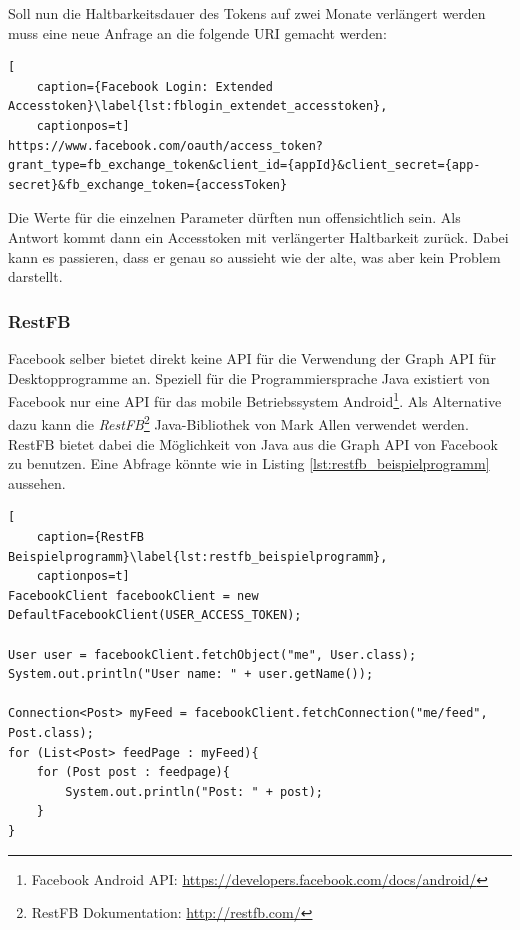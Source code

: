 Soll nun die Haltbarkeitsdauer des Tokens auf zwei Monate verlängert werden muss eine neue Anfrage an die folgende URI gemacht werden:

\begin{lstlisting}[
    caption={Facebook Login: Extended Accesstoken}\label{lst:fblogin_extendet_accesstoken},
    captionpos=t]
https://www.facebook.com/oauth/access_token?grant_type=fb_exchange_token&client_id={appId}&client_secret={app-secret}&fb_exchange_token={accessToken}
\end{lstlisting} 

Die Werte für die einzelnen Parameter dürften nun offensichtlich sein. Als Antwort kommt dann ein Accesstoken mit verlängerter Haltbarkeit zurück. Dabei kann es passieren, dass er genau so aussieht wie der alte, was aber kein Problem darstellt.



\subsubsection{RestFB} %
\label{ssub:restfb}

Facebook selber bietet direkt keine API für die Verwendung der Graph API für Desktopprogramme an. Speziell für die Programmiersprache Java existiert von Facebook nur eine API für das mobile Betriebssystem Android\footnote{Facebook Android API: \url{https://developers.facebook.com/docs/android/}}. Als Alternative dazu kann die \emph{RestFB}\footnote{RestFB Dokumentation: \url{ http://restfb.com/}} Java-Bibliothek von Mark Allen verwendet werden. RestFB bietet dabei die Möglichkeit von Java aus die Graph API von Facebook zu benutzen. Eine Abfrage könnte wie in Listing \ref{lst:restfb_beispielprogramm} aussehen.

\begin{lstlisting}[
    caption={RestFB Beispielprogramm}\label{lst:restfb_beispielprogramm},
    captionpos=t]
FacebookClient facebookClient = new DefaultFacebookClient(USER_ACCESS_TOKEN);

User user = facebookClient.fetchObject("me", User.class);
System.out.println("User name: " + user.getName());

Connection<Post> myFeed = facebookClient.fetchConnection("me/feed", Post.class);
for (List<Post> feedPage : myFeed){
    for (Post post : feedpage){
        System.out.println("Post: " + post);
    }
}
\end{lstlisting} 

